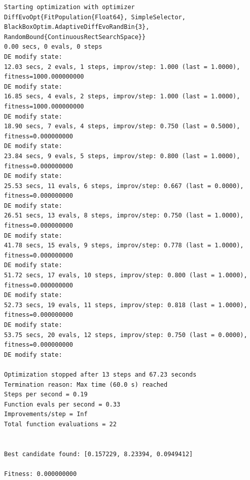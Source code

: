 \documentclass[
  12pt,
  a4paper,
  DIV=11,
  numbers=noendperiod]{scrreprt}
\begin{document}
\begin{verbatim}
Starting optimization with optimizer DiffEvoOpt{FitPopulation{Float64}, SimpleSelector, BlackBoxOptim.AdaptiveDiffEvoRandBin{3}, RandomBound{ContinuousRectSearchSpace}}
0.00 secs, 0 evals, 0 steps
DE modify state:
12.03 secs, 2 evals, 1 steps, improv/step: 1.000 (last = 1.0000), fitness=1000.000000000
DE modify state:
16.85 secs, 4 evals, 2 steps, improv/step: 1.000 (last = 1.0000), fitness=1000.000000000
DE modify state:
18.90 secs, 7 evals, 4 steps, improv/step: 0.750 (last = 0.5000), fitness=0.000000000
DE modify state:
23.84 secs, 9 evals, 5 steps, improv/step: 0.800 (last = 1.0000), fitness=0.000000000
DE modify state:
25.53 secs, 11 evals, 6 steps, improv/step: 0.667 (last = 0.0000), fitness=0.000000000
DE modify state:
26.51 secs, 13 evals, 8 steps, improv/step: 0.750 (last = 1.0000), fitness=0.000000000
DE modify state:
41.78 secs, 15 evals, 9 steps, improv/step: 0.778 (last = 1.0000), fitness=0.000000000
DE modify state:
51.72 secs, 17 evals, 10 steps, improv/step: 0.800 (last = 1.0000), fitness=0.000000000
DE modify state:
52.73 secs, 19 evals, 11 steps, improv/step: 0.818 (last = 1.0000), fitness=0.000000000
DE modify state:
53.75 secs, 20 evals, 12 steps, improv/step: 0.750 (last = 0.0000), fitness=0.000000000
DE modify state:

Optimization stopped after 13 steps and 67.23 seconds
Termination reason: Max time (60.0 s) reached
Steps per second = 0.19
Function evals per second = 0.33
Improvements/step = Inf
Total function evaluations = 22


Best candidate found: [0.157229, 8.23394, 0.0949412]

Fitness: 0.000000000
\end{verbatim}
\end{document}
